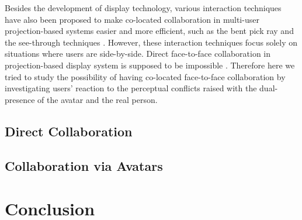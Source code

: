 Besides the development of display technology, various interaction techniques have also been proposed to make co-located collaboration in multi-user projection-based systems easier and more efficient, such as the bent pick ray \citep{Riege2006Bent} and the see-through techniques \citep{Argelaguet2010STT}. However, these interaction techniques focus solely on situations where users are side-by-side. Direct face-to-face collaboration in projection-based display system is supposed to be impossible \citep{Salzmann2009CIC}. Therefore here we tried to study the possibility of having co-located face-to-face collaboration by investigating users' reaction to the perceptual conflicts raised with the dual-presence of the avatar and the real person.

\subsection{Direct Collaboration}

\subsection{Collaboration via Avatars}

\section{Conclusion}

